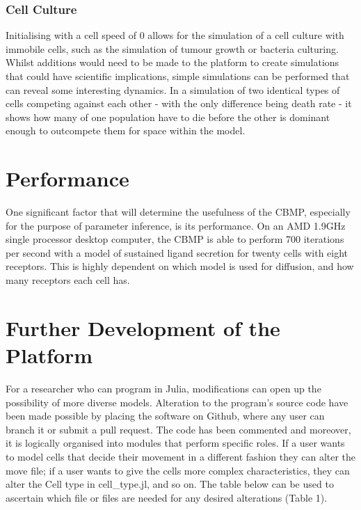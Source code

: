 \documentclass[12pt]{article}
\begin{document}
\subsubsection{Cell Culture}
Initialising with a cell speed of 0 allows for the simulation of a cell 
culture with immobile cells, such as the simulation of tumour growth or 
bacteria culturing. Whilst additions would need to be made to the 
platform to create simulations that could have scientific implications, 
simple simulations can be performed that can reveal some interesting 
dynamics. In a simulation of two identical types of cells competing 
against each other - with the only difference being death rate - it 
shows how many of one population have to die before the other is 
dominant enough to outcompete them for space within the model.

\section{Performance}

One significant factor that will determine the usefulness of the CBMP, 
especially for the purpose of parameter inference, is its performance. 
On an AMD 1.9GHz single processor desktop computer, the CBMP is able to 
perform 700 iterations per second with a model of sustained ligand 
secretion for twenty cells with eight receptors. This is highly 
dependent on which model is used for diffusion, and how many receptors 
each cell has.

\section{Further Development of the Platform}
For a researcher who can program in Julia, modifications can open up the 
possibility of more diverse models. Alteration to the program's source 
code have been made possible by placing the software on Github, where 
any user can branch it or submit a pull request. The code has been 
commented and moreover, it is logically organised into modules that 
perform specific roles. If a user wants to model cells that decide their 
movement in a different fashion they can alter the move file; if a user 
wants to give the cells more complex characteristics, they can alter the 
Cell type in cell\_type.jl, and so on. The table below can be used to 
ascertain which file or files are needed for any desired alterations 
(Table 1).
\end{document}
